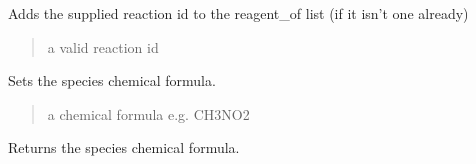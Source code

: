 \documentclass[letterpaper,12pt,english]{sphinxmanual}
\begin{document}
\begin{fulllineitems}
\begin{fulllineitems}
\label{\detokenize{api/core:cbmpy.CBModel.Species.setReagentOf}}
\pysigstartsignatures
\pysiglinewithargsret
{}
{}
{}
\pysigstopsignatures
\sphinxAtStartPar
Adds the supplied reaction id to the reagent\_of list (if it isn’t one already)
\begin{quote}\begin{description}
\sphinxAtStartPar
{} \textendash{} a valid reaction id

\end{description}\end{quote}

\end{fulllineitems}


\begin{fulllineitems}
\label{\detokenize{api/core:cbmpy.CBModel.Species.setChemFormula}}
\pysigstartsignatures
\pysiglinewithargsret
{}
{}
{}
\pysigstopsignatures
\sphinxAtStartPar
Sets the species chemical formula.
\begin{quote}\begin{description}
\sphinxAtStartPar
{} \textendash{} a chemical formula e.g. CH3NO2

\end{description}\end{quote}

\end{fulllineitems}


\begin{fulllineitems}
\label{\detokenize{api/core:cbmpy.CBModel.Species.getChemFormula}}
\pysigstartsignatures
\pysiglinewithargsret
{}
{}
{}
\pysigstopsignatures
\sphinxAtStartPar
Returns the species chemical formula.

\end{fulllineitems}



\end{fulllineitems}
\end{document}
